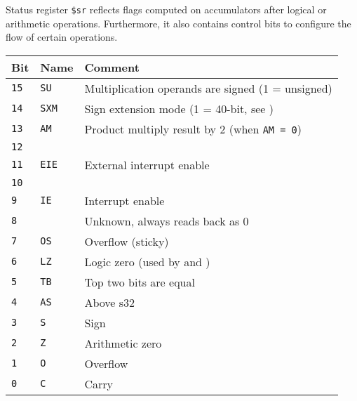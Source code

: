 \documentclass[oneside,english,a4paper,10pt,oneside,openany,final]{memoir}
\newcommand{\Opcode}[1]{\texttt{\nameref{instruction:#1}}}
\newcommand{\Register}[1]{\texttt{#1}}
\begin{document}
Status register \Register{\$sr} reflects flags computed on accumulators after logical or arithmetic operations.
Furthermore, it also contains control bits to configure the flow of certain operations.

\begin{table}[htb]
\centering
\begin{tabular}{|l|l|l|}
\hline
\textbf{Bit} & \textbf{Name} & \textbf{Comment}                                              \\ \hline
\texttt{15}  & \texttt{SU}   & Multiplication operands are signed (1 = unsigned)             \\ \hline
\texttt{14}  & \texttt{SXM}  & Sign extension mode (1 = 40-bit, see \nameref{subsec:SET40})  \\ \hline
\texttt{13}  & \texttt{AM}   & Product multiply result by 2 (when \texttt{AM = 0})           \\ \hline
\texttt{12}  &               &                                                               \\ \hline
\texttt{11}  & \texttt{EIE}  & External interrupt enable                                     \\ \hline
\texttt{10}  &               &                                                               \\ \hline
\texttt{9}   & \texttt{IE}   & Interrupt enable                                              \\ \hline
\texttt{8}   &               & Unknown, always reads back as 0                               \\ \hline
\texttt{7}   & \texttt{OS}   & Overflow (sticky)                                             \\ \hline
\texttt{6}   & \texttt{LZ}   & Logic zero (used by \Opcode{ANDCF} and \Opcode{ANDF})         \\ \hline
\texttt{5}   & \texttt{TB}   & Top two bits are equal                                        \\ \hline
\texttt{4}   & \texttt{AS}   & Above s32                                                     \\ \hline
\texttt{3}   & \texttt{S}    & Sign                                                          \\ \hline
\texttt{2}   & \texttt{Z}    & Arithmetic zero                                               \\ \hline
\texttt{1}   & \texttt{O}    & Overflow                                                      \\ \hline
\texttt{0}   & \texttt{C}    & Carry                                                         \\ \hline
\end{tabular}
\end{table}
\end{document}
